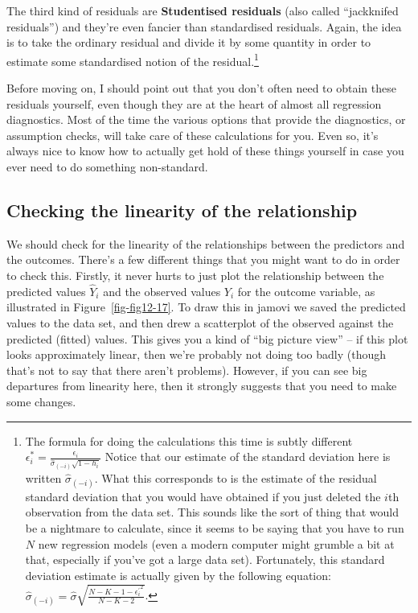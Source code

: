 \documentclass[
  a4paper,
]{book}
\begin{document}
The third kind of residuals are \textbf{Studentised residuals} (also
called ``jackknifed residuals'') and they're even fancier than
standardised residuals. Again, the idea is to take the ordinary residual
and divide it by some quantity in order to estimate some standardised
notion of the residual.\footnote{The formula for doing the calculations
  this time is subtly different
  \(\epsilon _i^*=\frac{\epsilon_i}{\hat{\sigma}_{(-i)}\sqrt{1-h_i}}\)
  Notice that our estimate of the standard deviation here is written
  \(\hat{\sigma}_{(-i)}\). What this corresponds to is the estimate of
  the residual standard deviation that you would have obtained if you
  just deleted the \(i\)th observation from the data set. This sounds
  like the sort of thing that would be a nightmare to calculate, since
  it seems to be saying that you have to run \(N\) new regression models
  (even a modern computer might grumble a bit at that, especially if
  you've got a large data set). Fortunately, this standard deviation
  estimate is actually given by the following equation:
  \(\hat{\sigma}_{(-i)}= \hat{\sigma}\sqrt{\frac{N-K-1-{\epsilon_i^{'}}^2}{N-K-2}}\).}

Before moving on, I should point out that you don't often need to obtain
these residuals yourself, even though they are at the heart of almost
all regression diagnostics. Most of the time the various options that
provide the diagnostics, or assumption checks, will take care of these
calculations for you. Even so, it's always nice to know how to actually
get hold of these things yourself in case you ever need to do something
non-standard.

\hypertarget{checking-the-linearity-of-the-relationship}{%
\subsection{Checking the linearity of the
relationship}\label{checking-the-linearity-of-the-relationship}}

We should check for the linearity of the relationships between the
predictors and the outcomes. There's a few different things that you
might want to do in order to check this. Firstly, it never hurts to just
plot the relationship between the predicted values \(\hat{Y}_i\) and the
observed values \(Y_i\) for the outcome variable, as illustrated in
Figure~\ref{fig-fig12-17}. To draw this in jamovi we saved the predicted
values to the data set, and then drew a scatterplot of the observed
against the predicted (fitted) values. This gives you a kind of ``big
picture view'' -- if this plot looks approximately linear, then we're
probably not doing too badly (though that's not to say that there aren't
problems). However, if you can see big departures from linearity here,
then it strongly suggests that you need to make some changes.
\end{document}
